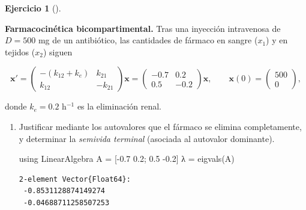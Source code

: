\documentclass[
  spanish,
  a4paper,
]{scrreport}
\newenvironment{Shaded}{\begin{snugshade}}{\end{snugshade}}
\newcommand{\BuiltInTok}[1]{\textcolor[rgb]{0.00,0.23,0.31}{#1}}
\newcommand{\FloatTok}[1]{\textcolor[rgb]{0.68,0.00,0.00}{#1}}
\newcommand{\FunctionTok}[1]{\textcolor[rgb]{0.28,0.35,0.67}{#1}}
\newcommand{\ImportTok}[1]{\textcolor[rgb]{0.00,0.46,0.62}{#1}}
\newcommand{\NormalTok}[1]{\textcolor[rgb]{0.00,0.23,0.31}{#1}}
\newcommand{\OperatorTok}[1]{\textcolor[rgb]{0.37,0.37,0.37}{#1}}
\theoremstyle{definition}
\newtheorem{exercise}{Ejercicio}[chapter]
\theoremstyle{remark}
\begin{document}
\begin{exercise}[]\protect\hypertarget{exr-farmacocinetica}{}\label{exr-farmacocinetica}

\textbf{Farmacocinética bicompartimental.} Tras una inyección
intravenosa de \(D=500\) mg de un antibiótico, las cantidades de fármaco
en sangre (\(x_1\)) y en tejidos (\(x_2\)) siguen

\[
\mathbf{x}' = \begin{pmatrix} -(k_{12}+k_e) & k_{21} \\ k_{12} & -k_{21} \end{pmatrix}\mathbf{x}
= \begin{pmatrix} -0.7 & 0.2 \\ 0.5 & -0.2 \end{pmatrix}\mathbf{x},
\qquad \mathbf{x}(0) = \begin{pmatrix} 500 \\ 0 \end{pmatrix},
\]

donde \(k_e = 0.2\) h\(^{-1}\) es la eliminación renal.

\begin{enumerate}
\def\labelenumi{\alph{enumi}.}
\item
  Justificar mediante los autovalores que el fármaco se elimina
  completamente, y determinar la \emph{semivida terminal} (asociada al
  autovalor dominante).

  \begin{tcolorbox}[enhanced jigsaw, arc=.35mm, bottomrule=.15mm, bottomtitle=1mm, breakable, colback=white, colbacktitle=quarto-callout-tip-color!10!white, colframe=quarto-callout-tip-color-frame, coltitle=black, left=2mm, leftrule=.75mm, opacityback=0, opacitybacktitle=0.6, rightrule=.15mm, title=\textcolor{quarto-callout-tip-color}{\faLightbulb}\hspace{0.5em}{Solución}, titlerule=0mm, toprule=.15mm, toptitle=1mm]

\begin{Shaded}
\begin{Highlighting}[]
\ImportTok{using} \BuiltInTok{LinearAlgebra}
\NormalTok{A }\OperatorTok{=}\NormalTok{ [}\OperatorTok{{-}}\FloatTok{0.7} \FloatTok{0.2}\NormalTok{; }\FloatTok{0.5} \OperatorTok{{-}}\FloatTok{0.2}\NormalTok{]}
\NormalTok{λ }\OperatorTok{=} \FunctionTok{eigvals}\NormalTok{(A)}
\end{Highlighting}
\end{Shaded}

\begin{verbatim}
2-element Vector{Float64}:
 -0.8531128874149274
 -0.04688711258507253
\end{verbatim}


\end{tcolorbox}
\end{enumerate}
\end{exercise}
\end{document}

